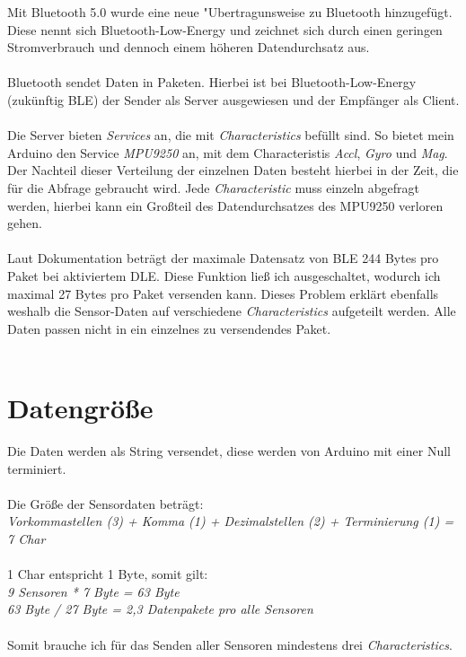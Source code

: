 Mit Bluetooth 5.0 wurde eine neue "Ubertragunsweise zu 
Bluetooth hinzugefügt. Diese nennt sich Bluetooth-Low-Energy und zeichnet
sich durch einen geringen Stromverbrauch und dennoch einem höheren 
Datendurchsatz aus. \\
\\
Bluetooth sendet Daten in Paketen. Hierbei ist bei Bluetooth-Low-Energy
(zukünftig BLE) der Sender als Server ausgewiesen und der Empfänger als Client.\\
\\
Die Server bieten \textit{Services} an, die mit \textit{Characteristics} befüllt sind.
So bietet mein Arduino den Service \textit{MPU9250} an, mit dem Characteristis \textit{Accl}, \textit{Gyro}
und \textit{Mag}.\\
Der Nachteil dieser Verteilung der einzelnen Daten besteht hierbei in der Zeit, die für die
Abfrage gebraucht wird. Jede \textit{Characteristic} muss einzeln abgefragt werden, hierbei kann ein
Großteil des Datendurchsatzes des MPU9250 verloren gehen.\\
\\
Laut Dokumentation beträgt der maximale Datensatz von BLE 244 Bytes pro Paket bei 
aktiviertem DLE. Diese Funktion ließ ich ausgeschaltet, wodurch ich maximal
27 Bytes pro Paket versenden kann. Dieses Problem erklärt ebenfalls weshalb die Sensor-Daten
auf verschiedene \textit{Characteristics} aufgeteilt werden. Alle Daten passen nicht in ein einzelnes
zu versendendes Paket. \\
\\

\section{Datengröße}
Die Daten werden als String versendet, diese werden von Arduino mit einer
Null terminiert. \\
\\
Die Größe der Sensordaten beträgt:\\
\textit{Vorkommastellen (3) + Komma (1) + Dezimalstellen (2) + Terminierung (1) = 7 Char}\\
\\
1 Char entspricht 1 Byte, somit gilt:\\
\textit{
9 Sensoren * 7 Byte = 63 Byte \\
63 Byte / 27 Byte = 2,3 Datenpakete pro alle Sensoren
}\\
\\
Somit brauche ich für das Senden aller Sensoren mindestens drei \textit{Characteristics}.


